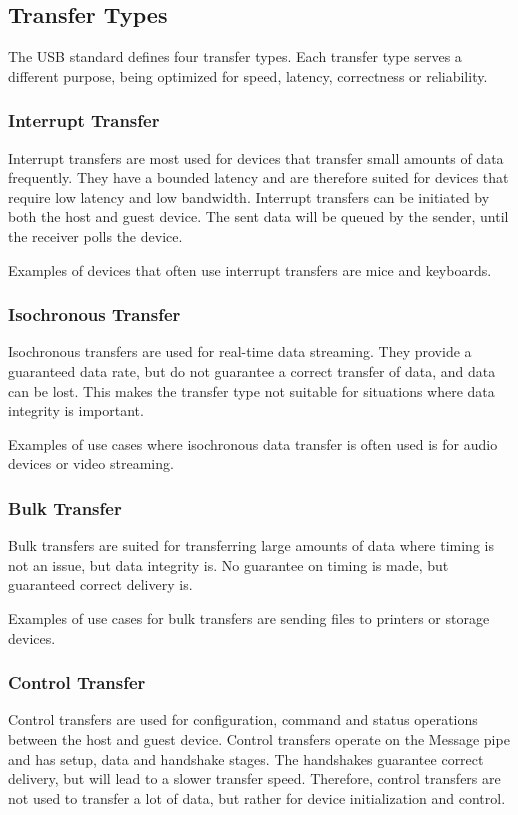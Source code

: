 \subsection{Transfer Types}
The USB standard defines four transfer types. Each transfer type serves a different purpose, being optimized for speed, latency, correctness or reliability.

\subsubsection{Interrupt Transfer}
Interrupt transfers are most used for devices that transfer small amounts of data frequently. They have a bounded latency and are therefore suited for devices that require low latency and low bandwidth. Interrupt transfers can be initiated by both the host and guest device. The sent data will be queued by the sender, until the receiver polls the device.

Examples of devices that often use interrupt transfers are mice and keyboards.

\subsubsection{Isochronous Transfer}
Isochronous transfers are used for real-time data streaming. They provide a guaranteed data rate, but do not guarantee a correct transfer of data, and data can be lost. This makes the transfer type not suitable for situations where data integrity is important.

Examples of use cases where isochronous data transfer is often used is for audio devices or video streaming.

\subsubsection{Bulk Transfer}
Bulk transfers are suited for transferring large amounts of data where timing is not an issue, but data integrity is. No guarantee on timing is made, but guaranteed correct delivery is.

Examples of use cases for bulk transfers are sending files to printers or storage devices.

\subsubsection{Control Transfer}
Control transfers are used for configuration, command and status operations between the host and guest device. Control transfers operate on the Message pipe and has setup, data and handshake stages. The handshakes guarantee correct delivery, but will lead to a slower transfer speed. Therefore, control transfers are not used to transfer a lot of data, but rather for device initialization and control.

